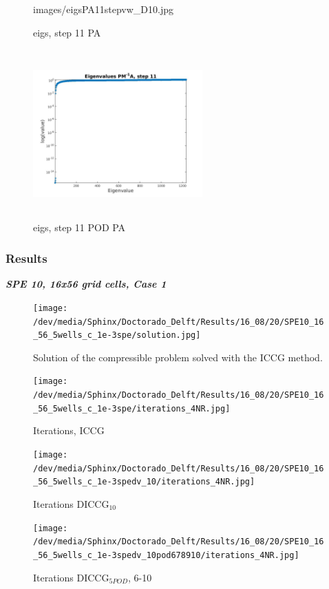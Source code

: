 \documentclass{beamer}
\begin{document}
\begin{frame}[shrink=10]
\begin{figure}[!h]
\begin{minipage}{.4\textwidth}
{images/eigsPA11stepvw_D10.jpg}
\caption{eigs, step 11 PA}
\label{fig:NR_D10}
\end{minipage}%
\hspace{15mm}
\begin{minipage}{.4\textwidth}
 \centering
\includegraphics[width=6.5cm,height=6.5cm,keepaspectratio]
{images/eigsPA11stepvw_POD5.jpg}
\caption{eigs, step 11 POD PA}
\label{fig:NR_POD5}
\end{minipage}
\end{figure}
\end{frame}
\begin{frame}[shrink=5]
\frametitle{Results}
\emph{\Large \textbf{SPE 10, 16x56 grid cells, Case 1}}
\begin{figure}[!h]
\centering 
\begin{minipage}{.45\textwidth}
 \centering
\texttt{[image: /dev/media/Sphinx/Doctorado\_Delft/Results/16\_08/20/SPE10\_16\_56\_5wells\_c\_1e-3spe/solution.jpg]}
\caption{Solution of the compressible problem solved with the ICCG method.}
\label{fig:compsol}
\end{minipage}%
\hspace{10mm}
\begin{minipage}{.45\textwidth}
 \centering
\texttt{[image: /dev/media/Sphinx/Doctorado\_Delft/Results/16\_08/20/SPE10\_16\_56\_5wells\_c\_1e-3spe/iterations\_4NR.jpg]}
\caption{Iterations, ICCG}
\label{fig:NR_IC}
\end{minipage}
\end{figure}
\begin{figure}[!h]
\centering
\begin{minipage}{.4\textwidth}
 \centering
\texttt{[image: /dev/media/Sphinx/Doctorado\_Delft/Results/16\_08/20/SPE10\_16\_56\_5wells\_c\_1e-3spedv\_10/iterations\_4NR.jpg]}
\caption{Iterations DICCG$_{10}$}
\label{fig:NR_D10}
\end{minipage}%
\hspace{15mm}
\begin{minipage}{.4\textwidth}
 \centering
\texttt{[image: /dev/media/Sphinx/Doctorado\_Delft/Results/16\_08/20/SPE10\_16\_56\_5wells\_c\_1e-3spedv\_10pod678910/iterations\_4NR.jpg]}
\caption{Iterations DICCG$_{5POD}$, 6-10}
\label{fig:NR_POD5}
\end{minipage}
\end{figure}
\end{frame}
\end{document}
